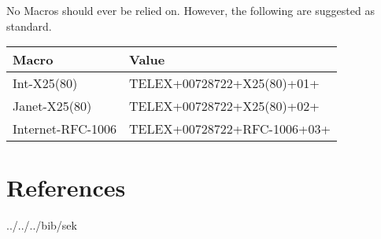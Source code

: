 No Macros should ever be relied on.  However, the following are suggested as
standard.

\begin {center}
\begin {tabular}{|l|l|}
\hline
Macro & Value \\
\hline
Int-X25(80) & TELEX+00728722+X25(80)+01+ \\
Janet-X25(80) & TELEX+00728722+X25(80)+02+ \\
Internet-RFC-1006 & TELEX+00728722+RFC-1006+03+ \\
\hline
\end {tabular}

\end {center}

\section {References}

 {../../../bib/sek}


